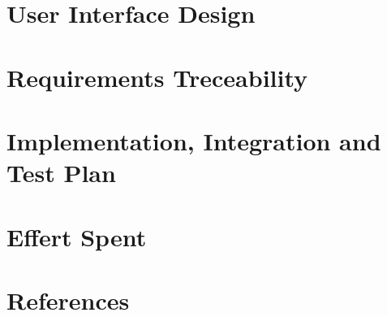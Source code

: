 \documentclass{config/PoliMi3i_thesis}
\begin{document}
\chapter{User Interface Design}


\chapter{Requirements Treceability}


\chapter{Implementation, Integration and Test Plan}


\chapter{Effert Spent}


\chapter{References}





\listoffigures
\listoftables

\cleardoublepage
\end{document}

